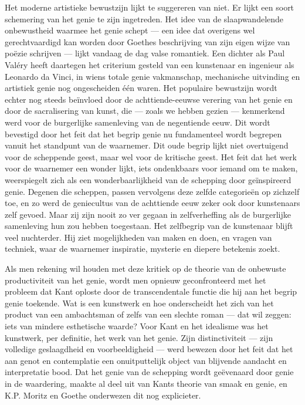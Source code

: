 Het moderne artistieke bewustzijn lijkt te suggereren van niet. Er lijkt een soort schemering van het genie te zijn ingetreden. Het idee van de slaapwandelende onbewustheid waarmee het genie schept — een idee dat overigens wel gerechtvaardigd kan worden door Goethes beschrijving van zijn eigen wijze van poëzie schrijven — lijkt vandaag de dag valse romantiek. Een dichter als Paul Valéry heeft daartegen het criterium gesteld van een kunstenaar en ingenieur als Leonardo da Vinci, in wiens totale genie vakmanschap, mechanische uitvinding en artistiek genie nog ongescheiden één waren. Het populaire bewustzijn wordt echter nog steeds beïnvloed door de achttiende-eeuwse verering van het genie en door de sacralisering van kunst, die — zoals we hebben gezien — kenmerkend werd voor de burgerlijke samenleving van de negentiende eeuw. Dit wordt bevestigd door het feit dat het begrip genie nu fundamenteel wordt begrepen vanuit het standpunt van de waarnemer. Dit oude begrip lijkt niet overtuigend voor de scheppende geest, maar wel voor de kritische geest. Het feit dat het werk voor de waarnemer een wonder lijkt, iets ondenkbaars voor iemand om te maken, weerspiegelt zich als een wonderbaarlijkheid van de schepping door geïnspireerd genie. Degenen die scheppen, passen vervolgens deze zelfde categorieën op zichzelf toe, en zo werd de geniecultus van de achttiende eeuw zeker ook door kunstenaars zelf gevoed. Maar zij zijn nooit zo ver gegaan in zelfverheffing als de burgerlijke samenleving hun zou hebben toegestaan. Het zelfbegrip van de kunstenaar blijft veel nuchterder. Hij ziet mogelijkheden van maken en doen, en vragen van techniek, waar de waarnemer inspiratie, mysterie en diepere betekenis zoekt.

Als men rekening wil houden met deze kritiek op de theorie van de onbewuste productiviteit van het genie, wordt men opnieuw geconfronteerd met het probleem dat Kant oploste door de transcendentale functie die hij aan het begrip genie toekende. Wat is een kunstwerk en hoe onderscheidt het zich van het product van een ambachtsman of zelfs van een slechte roman — dat wil zeggen: iets van mindere esthetische waarde? Voor Kant en het idealisme was het kunstwerk, per definitie, het werk van het genie. Zijn distinctiviteit — zijn volledige geslaagdheid en voorbeeldigheid — werd bewezen door het feit dat het aan genot en contemplatie een onuitputtelijk object van blijvende aandacht en interpretatie bood. Dat het genie van de schepping wordt geëvenaard door genie in de waardering, maakte al deel uit van Kants theorie van smaak en genie, en K.P. Moritz en Goethe onderwezen dit nog explicieter.

